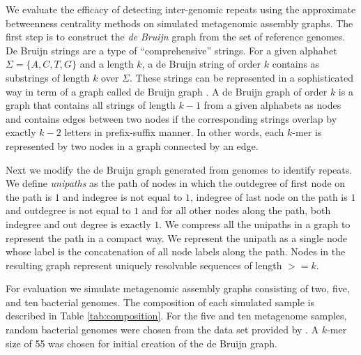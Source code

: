 \documentclass[runningheads,a4paper]{llncs}
\begin{document}
We evaluate the efficacy of detecting inter-genomic repeats using the approximate betweenness centrality methods on simulated metagenomic assembly graphs.
The first step is to construct the \textit{de Bruijn} graph from the set of reference genomes.
De Bruijn strings are a type of ``comprehensive'' strings. For a given alphabet $\Sigma = \{A,C,T,G\}$ and a length $k$, a de Bruijn string of order $k$ contains as substrings of length $k$ over $\Sigma$. These strings can be represented in a sophisticated way in term of a graph called de Bruijn graph \cite{debruijn}. A de Bruijn graph of order $k$ is a graph that contains all strings of length $k-1$ from a given alphabets as nodes and contains edges between two nodes if the corresponding strings overlap by exactly $k-2$ letters in prefix-suffix manner. In other words, each $k$-mer is represented by two nodes in a graph connected by an edge. 

Next we modify the de Bruijn graph generated from genomes to identify repeats. We define \textit{unipaths} as the path of nodes in which the outdegree of first node on the path is $1$ and indegree is not equal to $1$, indegree of last node on the path is $1$ and outdegree is not equal to $1$ and for all other nodes along the path, both indegree and out degree is exactly $1$. We compress all the unipaths in a graph to represent the path in a compact way. We represent the unipath as a single node whose label is the concatenation of all node labels along the path.
Nodes in the resulting graph represent uniquely resolvable sequences of length $>= k$.

For evaluation we simulate metagenomic assembly graphs consisting of two, five, and ten bacterial genomes.
The composition of each simulated sample is described in Table \ref{tab:composition}.
For the five and ten metagenome samples, random bacterial genomes were chosen from the data set provided by \cite{shakya2013comparative}.
A $k$-mer size of 55 was chosen for initial creation of the de Bruijn graph.
\end{document}
